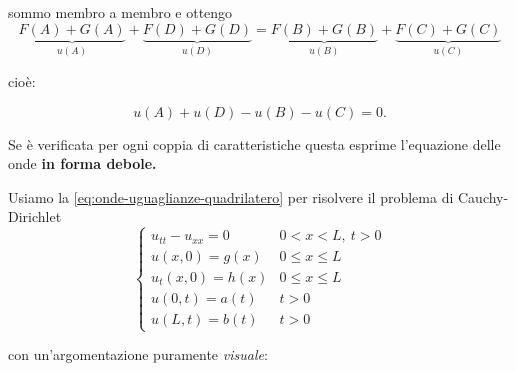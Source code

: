 \documentclass[10pt,a4paper,twoside,openright]{book}
\begin{document}
\begin{enumerate}
          sommo membro a membro e ottengo
          \begin{equation*}
              \underbrace{F(A) +G(A)}_{u(A)} +\underbrace{F(D) +G(D)}_{u(D)} =\underbrace{F(B) +G(B)}_{u(B)} +\underbrace{F(C) +G(C)}_{u(C)}
          \end{equation*}

          cioè:

          \begin{equation}
              u(A) +u(D) -u(B) -u(C) =0.
              \label{eq:onde-uguaglianze-quadrilatero}
          \end{equation}

          Se è verificata per ogni coppia di caratteristiche questa esprime l'equazione delle onde \textbf{in forma debole.}

          Usiamo la \eqref{eq:onde-uguaglianze-quadrilatero} per risolvere il problema di Cauchy-Dirichlet
          \begin{equation*}
              \begin{cases}
                  u_{tt} -u_{xx} =0 & 0< x< L,\ t >0          \\
                  u(x,0) =g(x)      & 0\leqslant x\leqslant L \\
                  u_{t}(x,0) =h(x)  & 0\leqslant x\leqslant L \\
                  u(0,t) =a(t)      & t >0                    \\
                  u(L,t) =b(t)      & t >0
              \end{cases}
          \end{equation*}

          con un'argomentazione puramente \textit{visuale}:

          \begin{figure}[htpb]
              \centering

              \begin{tikzpicture}[x=0.75pt,y=0.75pt,yscale=-1,xscale=1]


\end{tikzpicture}
\end{figure}
\end{enumerate}
\end{document}
